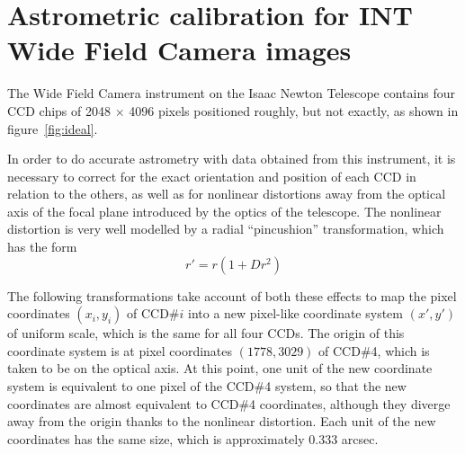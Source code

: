 \documentclass[twoside,11pt]{starlink}
\begin{document}
\scfrontmatter

\section{Astrometric calibration for INT Wide Field Camera images}

The Wide Field Camera instrument on the Isaac Newton Telescope
contains four CCD chips of 2048 $\times$ 4096 pixels
positioned roughly, but not exactly, as shown in
figure~\ref{fig:ideal}.


In order to do accurate astrometry with data obtained
from this instrument, it is necessary to correct for the
exact orientation and position of each CCD in relation to
the others, as well as for nonlinear distortions
away from the optical axis of the focal plane introduced by
the optics of the telescope.
The nonlinear distortion is very well modelled by a radial ``pincushion''
transformation, which has the form
\begin{displaymath}
  r' = r ( 1 + D r^2 )
\end{displaymath}

The following transformations take account of both these effects
to map the pixel coordinates $(x_i, y_i)$
of CCD\#$i$ into a new pixel-like coordinate system
$(x', y')$
of uniform scale, which is the same for all four CCDs.
The origin of this coordinate system is at pixel coordinates
$(1778, 3029)$ of CCD\#4, which is taken to be on the optical axis.
At this point, one unit of the new coordinate system is equivalent
to one pixel of the CCD\#4 system, so that the new coordinates
are almost equivalent to CCD\#4 coordinates, although they diverge
away from the origin thanks to the nonlinear distortion.
Each unit of the new coordinates has the same size,
which is approximately 0.333 arcsec.
\end{document}
